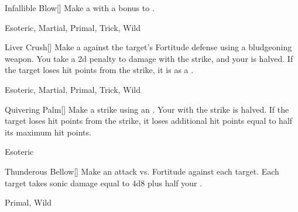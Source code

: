 \lowercase{\hypertarget{maneuver:Infallible Blow}{}}\label{maneuver:Infallible Blow}
\hypertarget{maneuver:Infallible Blow}{}
\begin{freeability}[Rank 7]{Infallible Blow}[]
Make a  with a  bonus to .


 Esoteric, Martial, Primal, Trick, Wild
\end{freeability}
\vspace{0.25em}



\lowercase{\hypertarget{maneuver:Liver Crush}{}}\label{maneuver:Liver Crush}
\hypertarget{maneuver:Liver Crush}{}
\begin{freeability}[Rank 7]{Liver Crush}[]
Make a  against the target's Fortitude defense using a bludgeoning weapon.
You take a \minus2d penalty to damage with the strike, and your  is halved.
If the target loses hit points from the strike, it is  as a .


 Esoteric, Martial, Primal, Trick, Wild
\end{freeability}
\vspace{0.25em}



\lowercase{\hypertarget{maneuver:Quivering Palm}{}}\label{maneuver:Quivering Palm}
\hypertarget{maneuver:Quivering Palm}{}
\begin{freeability}[Rank 7]{Quivering Palm}[]
Make a strike using an .
Your  with the strike is halved.
If the target loses hit points from the strike, it loses additional hit points equal to half its maximum hit points.


 Esoteric
\end{freeability}
\vspace{0.25em}



\lowercase{\hypertarget{maneuver:Thunderous Bellow}{}}\label{maneuver:Thunderous Bellow}
\hypertarget{maneuver:Thunderous Bellow}{}
\begin{freeability}[Rank 7]{Thunderous Bellow}[]
Make an attack vs. Fortitude against each target.
\hit Each target takes sonic damage equal to 4d8 plus half your .


 Primal, Wild
\end{freeability}
\vspace{0.25em}



